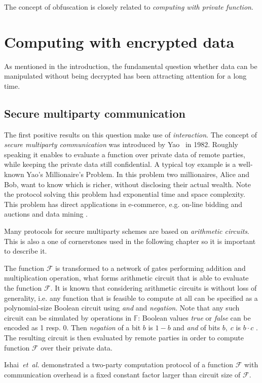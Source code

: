 \documentclass[11pt,oneside,final]{fithesis2}
\newcommand{\eal}{\emph{et~al.}}
\begin{document}
    The concept of obfuscation is closely related to \emph{computing with private function}.

\section{Computing with encrypted data}
As mentioned in the introduction, the fundamental question whether data can be manipulated without being 
decrypted has been attracting attention for a long time. 

\subsection{Secure multiparty communication}
The first positive results on this question make use of \emph{interaction}. The concept of \emph{secure multiparty communication} was 
introduced by Yao~\citep{Yao:1982:PSC:1398511.1382751} in 1982. Roughly speaking it enables to evaluate a function over private
data of remote parties, while keeping the private data still confidential. A typical toy example is a well-known 
Yao's Millionaire's Problem. In this problem two millionaires, Alice and Bob, want to know which is richer, without 
disclosing their actual wealth. Note the protocol solving this problem had exponential time and space complexity. 
This problem has direct applications in e-commerce, e.g. on-line bidding and auctions and data mining \citep{smcBook}.

Many protocols for secure multiparty schemes are based on \emph{arithmetic circuits}. This is also a one of cornerstones 
used in the following chapter so it is important to describe it.

The function $\mathcal{F}$ is transformed to a network of gates performing addition and multiplication operation, what forms arithmetic circuit
that is able to evaluate the function $\mathcal{F}$.
It is known that considering arithmetic circuits is without loss of generality, i.e. any function that is feasible to compute 
at all can be specified as a polynomial-size Boolean circuit using \emph{and} and \emph{negation}. Note that any such circuit 
can be simulated by operations in $\mathbb{F}$: Boolean values \emph{true} or \emph{false} can be encoded as 1 resp. 0. Then
\emph{negation} of a bit $b$ is $1-b$ and \emph{and} of bits $b,\;c$ is $b\cdot c$ \citep{smcBook}. The resulting 
circuit is then evaluated by remote parties in order to compute function $\mathcal{F}$ over their private data. 

Ishai~\eal\citep{Ishai:2008:FCO:1429103.1429148} demonstrated a two-party computation protocol of a function
$\mathcal{F}$ with communication overhead is a fixed constant factor larger than circuit size of $\mathcal{F}$. 
\end{document}
